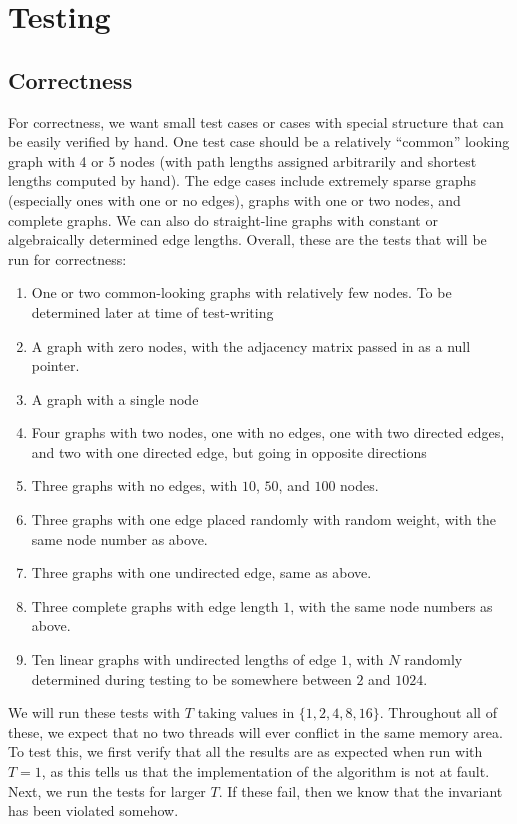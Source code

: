 \documentclass{article}
\begin{document}
\section*{Testing}
\subsection*{Correctness}
For correctness, we want small test cases or cases with special structure that can be easily verified by hand. One test case should be a relatively ``common'' looking graph with 4 or 5 nodes (with path lengths assigned arbitrarily and shortest lengths computed by hand). The edge cases include extremely sparse graphs (especially ones with one or no edges), graphs with one or two nodes, and complete graphs. We can also do straight-line graphs with constant or algebraically determined edge lengths. Overall, these are the tests that will be run for correctness:
\begin{enumerate}
    \item One or two common-looking graphs with relatively few nodes. To be determined later at time of test-writing
    \item A graph with zero nodes, with the adjacency matrix passed in as a null pointer.
    \item A graph with a single node
    \item Four graphs with two nodes, one with no edges, one with two directed edges, and two with one directed edge, but going in opposite directions
    \item Three graphs with no edges, with $10$, $50$, and $100$ nodes.
    \item Three graphs with one edge placed randomly with random weight, with the same node number as above.
    \item Three graphs with one undirected edge, same as above.
    \item Three complete graphs with edge length $1$, with the same node numbers as above.
    \item Ten linear graphs with undirected lengths of edge $1$, with $N$ randomly determined during testing to be somewhere between $2$ and $1024$.
\end{enumerate}
We will run these tests with $T$ taking values in $\{1,2,4,8,16\}$. Throughout all of these, we expect that no two threads will ever conflict in the same memory area. To test this, we first verify that all the results are as expected when run with $T=1$, as this tells us that the implementation of the algorithm is not at fault. Next, we run the tests for larger $T$. If these fail, then we know that the invariant has been violated somehow.
\end{document}

